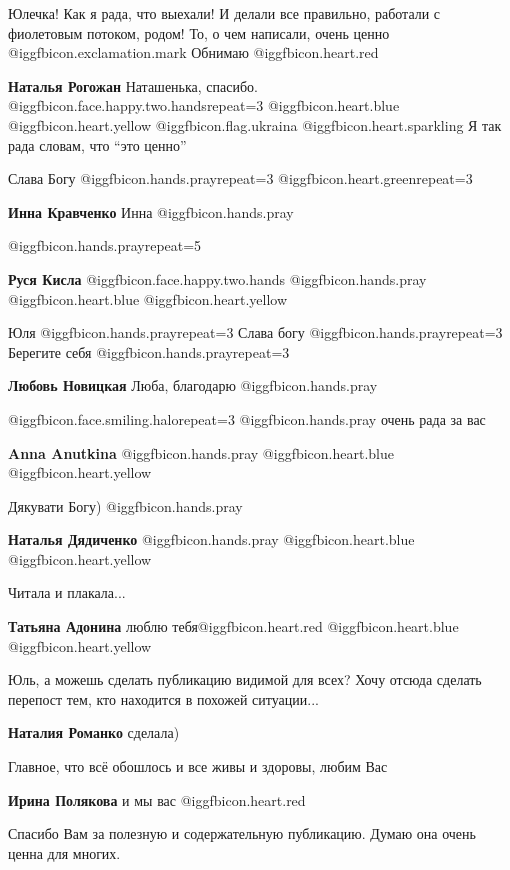 \begin{itemize}

Юлечка! Как я рада, что выехали! И делали все правильно, работали с фиолетовым
потоком, родом! То, о чем написали, очень ценно
@igg{fbicon.exclamation.mark} Обнимаю @igg{fbicon.heart.red}

\textbf{Наталья Рогожан} Наташенька, спасибо. @igg{fbicon.face.happy.two.hands}{repeat=3}  @igg{fbicon.heart.blue}  @igg{fbicon.heart.yellow} @igg{fbicon.flag.ukraina} @igg{fbicon.heart.sparkling} 
Я так рада словам, что \enquote{это ценно}

Слава Богу @igg{fbicon.hands.pray}{repeat=3} 
 @igg{fbicon.heart.green}{repeat=3} 

\textbf{Инна Кравченко} Инна  @igg{fbicon.hands.pray} 

 @igg{fbicon.hands.pray}{repeat=5} 

\textbf{Руся Кисла}  @igg{fbicon.face.happy.two.hands}  @igg{fbicon.hands.pray}  @igg{fbicon.heart.blue}  @igg{fbicon.heart.yellow} 

Юля @igg{fbicon.hands.pray}{repeat=3} 
Слава богу  @igg{fbicon.hands.pray}{repeat=3} 
Берегите себя  @igg{fbicon.hands.pray}{repeat=3} 

\textbf{Любовь Новицкая} Люба, благодарю  @igg{fbicon.hands.pray} 

 @igg{fbicon.face.smiling.halo}{repeat=3}  @igg{fbicon.hands.pray}  очень рада за вас

\textbf{Anna Anutkina}  @igg{fbicon.hands.pray}  @igg{fbicon.heart.blue}  @igg{fbicon.heart.yellow} 

Дякувати Богу) @igg{fbicon.hands.pray} 

\textbf{Наталья Дядиченко}  @igg{fbicon.hands.pray}  @igg{fbicon.heart.blue}  @igg{fbicon.heart.yellow} 

Читала и плакала...

\textbf{Татьяна Адонина} люблю тебя@igg{fbicon.heart.red} @igg{fbicon.heart.blue}  @igg{fbicon.heart.yellow} 


Юль, а можешь сделать публикацию видимой для всех? Хочу отсюда сделать перепост
тем, кто находится в похожей ситуации...

\textbf{Наталия Романко} сделала)

Главное, что всё обошлось и все живы и здоровы, любим Вас

\textbf{Ирина Полякова} и мы вас @igg{fbicon.heart.red}

Спасибо Вам за полезную и содержательную публикацию. Думаю она очень ценна для многих.

\end{itemize} %
